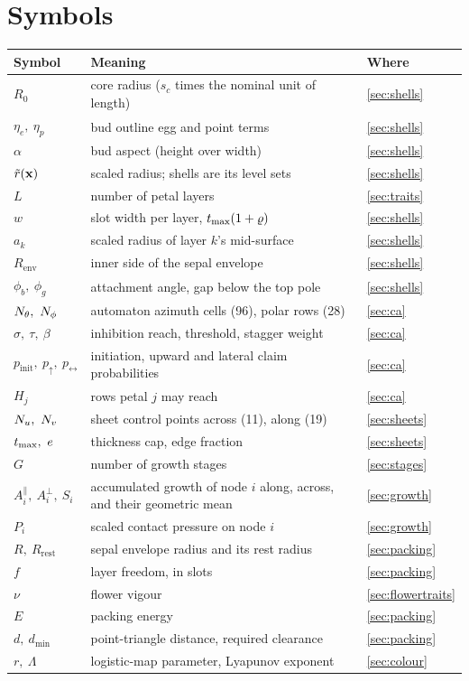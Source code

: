 \section{Symbols}\label{sec:symbols}

\begin{center}\small
\begin{tabularx}{\linewidth}{@{}l X l@{}}
\toprule
Symbol & Meaning & Where \\
\midrule
$R_0$ & core radius ($s_c$ times the nominal unit of length) & \cref{sec:shells} \\
$\eta_e,\ \eta_p$ & bud outline egg and point terms & \cref{sec:shells} \\
$\alpha$ & bud aspect (height over width) & \cref{sec:shells} \\
$\tilde r(\mathbf{x})$ & scaled radius; shells are its level sets & \cref{sec:shells} \\
$L$ & number of petal layers & \cref{sec:traits} \\
$w$ & slot width per layer, $t_{\max}(1+\varrho)$ & \cref{sec:shells} \\
$a_k$ & scaled radius of layer $k$'s mid-surface & \cref{sec:shells} \\
$R_{\mathrm{env}}$ & inner side of the sepal envelope & \cref{sec:shells} \\
$\phi_b,\ \phi_g$ & attachment angle, gap below the top pole & \cref{sec:shells} \\
$\NA,\ \NP$ & automaton azimuth cells (96), polar rows (28) & \cref{sec:ca} \\
$\sigma,\ \tau,\ \beta$ & inhibition reach, threshold, stagger weight & \cref{sec:ca} \\
$p_{\mathrm{init}},\ p_\uparrow,\ p_\leftrightarrow$ & initiation, upward and lateral claim probabilities & \cref{sec:ca} \\
$H_j$ & rows petal $j$ may reach & \cref{sec:ca} \\
$\NU,\ \NV$ & sheet control points across (11), along (19) & \cref{sec:sheets} \\
$\tmax,\ e$ & thickness cap, edge fraction & \cref{sec:sheets} \\
$G$ & number of growth stages & \cref{sec:stages} \\
$A^\parallel_i,\ A^\perp_i,\ S_i$ & accumulated growth of node $i$ along, across, and their geometric mean & \cref{sec:growth} \\
$P_i$ & scaled contact pressure on node $i$ & \cref{sec:growth} \\
$R,\ R_{\mathrm{rest}}$ & sepal envelope radius and its rest radius & \cref{sec:packing} \\
$f$ & layer freedom, in slots & \cref{sec:packing} \\
$\nu$ & flower vigour & \cref{sec:flowertraits} \\
$E$ & packing energy & \cref{sec:packing} \\
$d,\ d_{\min}$ & point-triangle distance, required clearance & \cref{sec:packing} \\
$r,\ \Lambda$ & logistic-map parameter, Lyapunov exponent & \cref{sec:colour} \\
\bottomrule
\end{tabularx}
\end{center}
